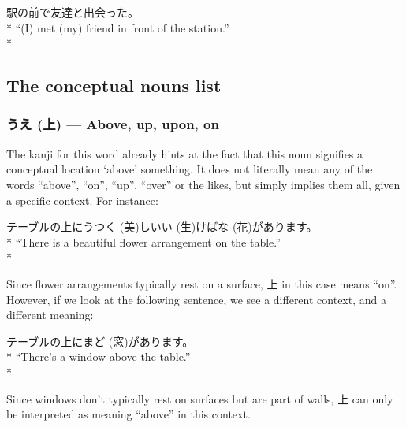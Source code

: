 \documentclass[11pt, b5paper, twoside, openright, onecolumn]{book}
\makeatletter
\newcommand*{\rubystack}[2]{{\relscale{0.5}%
  \begin{tabular}[b]{@{}c@{}}%
    {#1}\\%
   {\textscale{2}{#2}}%
  \end{tabular}}%
}
\DeclareRobustCommand*{\ruby}[2]{%
  \mbox{%
    \setlength{\parskip}{0ex}%
    \BeginAccSupp{method=pdfstringdef,ActualText={#1}}%
      \rubystack{\phantom{#2}}{#1}%
      \llap{%
        \rubystack{#2}{\phantom{#1}}%
      }%
    \EndAccSupp{}%
  }%
}
\renewcommand*{\ruby}[2]{#2 (#1)}%
\newenvironment{exampleblock}{
\setlength{\parindent}{0.6in}
\begin{minipage}[t]{\dimexpr\textwidth-\parindent}}
{\end{minipage}}
\makeatother
\begin{document}
\vspace{0.4cm}
\begin{exampleblock}
駅の前で友達と出会った。 \\* 
“(I) met (my) friend in front of the station.” \\* 
\end{exampleblock}
\subsection{The conceptual nouns list}


\subsubsection{\ruby{上}{うえ} — Above‚ up‚ upon‚ on}

The kanji for this word already hints at the fact that this noun signifies a conceptual location ‘above’ something. It does not literally mean any of the words “above”‚ “on”‚ “up”‚ “over” or the likes‚ but simply implies them all‚ given a specific context. For instance:

\vspace{0.4cm}
\begin{exampleblock}
テーブルの上に\ruby{美}{うつく}しい\ruby{生}{い}け\ruby{花}{ばな}があります。 \\* 
“There is a beautiful flower arrangement on the table.” \\* 
\end{exampleblock}
\vspace{0.2cm}

Since flower arrangements typically rest on a surface‚ 上 in this case means “on”. However‚ if we look at the following sentence‚ we see a different context‚ and a different meaning:

\vspace{0.4cm}
\begin{exampleblock}
テーブルの上に\ruby{窓}{まど}があります。 \\* 
“There’s a window above the table.” \\* 
\end{exampleblock}
\vspace{0.2cm}

Since windows don’t typically rest on surfaces but are part of walls‚ 上 can only be interpreted as meaning “above” in this context.
\end{document}
